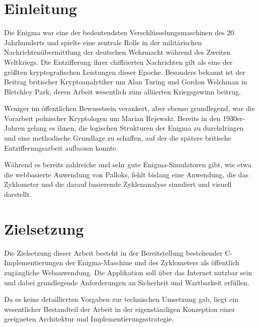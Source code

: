 \documentclass[12pt, ngerman, a4paper, numbers=noenddot]{article}
\begin{document}
\newpage
{}
\renewcommand{\thepage}{\arabic{page}}



	



\newpage

\glsaddall

\section{Einleitung}

Die Enigma war eine der bedeutendsten Verschlüsselungsmaschinen des 20. Jahrhunderts und spielte eine zentrale Rolle in der militärischen Nachrichtenübermittlung der deutschen Wehrmacht während des Zweiten Weltkriegs. Die Entzifferung ihrer chiffrierten Nachrichten gilt als eine der größten kryptografischen Leistungen dieser Epoche. Besonders bekannt ist der Beitrag britischer Kryptoanalytiker um Alan Turing und Gordon Welchman in Bletchley Park, deren Arbeit wesentlich zum alliierten Kriegsgewinn beitrug. 

Weniger im öffentlichen Bewusstsein verankert, aber ebenso grundlegend, war die Vorarbeit polnischer Kryptologen um Marian Rejewski. Bereits in den 1930er-Jahren gelang es ihnen, die logischen Strukturen der Enigma zu durchdringen und eine methodische Grundlage zu schaffen, auf der die spätere britische Entzifferungsarbeit aufbauen konnte.

Während es bereits zahlreiche und sehr gute Enigma-Simulatoren gibt, wie etwa die webbasierte Anwendung von Palloks\autocite{enigma_simulator_palloks}, fehlt bislang eine Anwendung, die das Zyklometer und die darauf basierende Zyklenanalyse simuliert und visuell darstellt.


\newpage
\section{Zielsetzung}
Die Zielsetzung dieser Arbeit besteht in der Bereitstellung bestehender C\hyp{}Im\-ple\-men\-tie\-run\-gen der Enigma\hyp{}Maschine und des Zyklometers als öffentlich zugängliche Webanwendung. Die Applikation soll über das Internet nutzbar sein und dabei grundlegende Anforderungen an Sicherheit und Wartbarkeit erfüllen.  


Da es keine detaillierten Vorgaben zur technischen Umsetzung gab, liegt ein wesentlicher Bestandteil der Arbeit in der eigenständigen Konzeption einer geeigneten Architektur und Implementierungsstrategie.  
\end{document}
